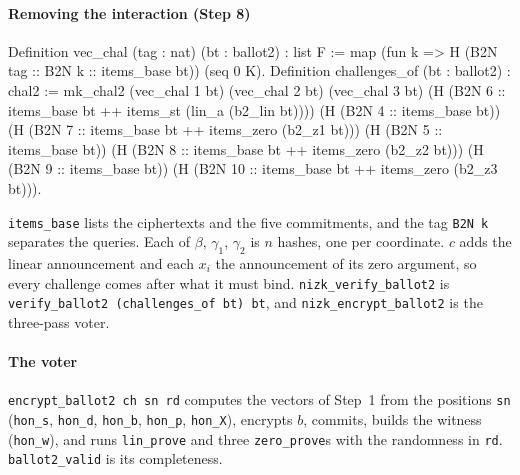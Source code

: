 \documentclass[11pt,a4paper]{article}
\newcommand{\rocq}[1]{\texttt{#1}}
\theoremstyle{remark}
\begin{document}
\paragraph{Removing the interaction (Step 8)}
\begin{coq}
Definition vec_chal (tag : nat) (bt : ballot2) : list F :=
  map (fun k => H (B2N tag :: B2N k :: items_base bt)) (seq 0 K).
Definition challenges_of (bt : ballot2) : chal2 :=
  mk_chal2 (vec_chal 1 bt) (vec_chal 2 bt) (vec_chal 3 bt)
    (H (B2N 6 :: items_base bt ++ items_st (lin_a (b2_lin bt))))
    (H (B2N 4 :: items_base bt)) (H (B2N 7 :: items_base bt ++ items_zero (b2_z1 bt)))
    (H (B2N 5 :: items_base bt)) (H (B2N 8 :: items_base bt ++ items_zero (b2_z2 bt)))
    (H (B2N 9 :: items_base bt)) (H (B2N 10 :: items_base bt ++ items_zero (b2_z3 bt))).
\end{coq}
\rocq{items\_base} lists the ciphertexts and the five commitments, and
the tag \rocq{B2N k} separates the queries. Each of $\beta$, $\gamma_1$,
$\gamma_2$ is $n$ hashes, one per coordinate. $c$ adds the linear
announcement and each $x_i$ the announcement of its zero argument, so
every challenge comes after what it must bind. \rocq{nizk\_verify\_ballot2}
is \rocq{verify\_ballot2 (challenges\_of bt) bt}, and
\rocq{nizk\_encrypt\_ballot2} is the three-pass voter.

\paragraph{The voter} \rocq{encrypt\_ballot2 ch sn rd} computes the
vectors of Step~1 from the positions \rocq{sn} (\rocq{hon\_s},
\rocq{hon\_d}, \rocq{hon\_b}, \rocq{hon\_p}, \rocq{hon\_X}), encrypts $b$,
commits, builds the witness (\rocq{hon\_w}), and runs \rocq{lin\_prove}
and three \rocq{zero\_prove}s with the randomness in \rocq{rd}.
\rocq{ballot2\_valid} is its completeness.
\end{document}
